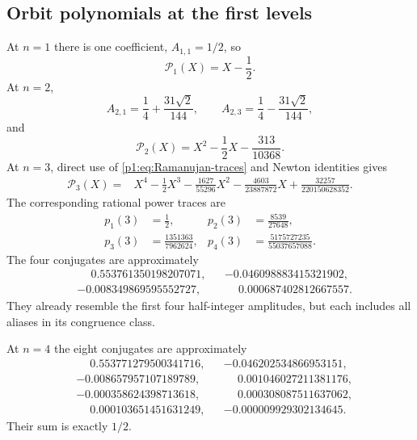 \documentclass[11pt,oneside]{article}
\theoremstyle{definition}
\theoremstyle{remark}
\begin{document}
\subsection{Orbit polynomials at the first levels}

At $n=1$ there is one coefficient, $A_{1,1}=1/2$, so
\begin{equation}\label{p1:eq:P1-poly}
 \mathcal P_1(X)=X-\frac12.
\end{equation}
At $n=2$,
\begin{equation}\label{p1:eq:A2-values}
 A_{2,1}=\frac14+\frac{31\sqrt2}{144},
 \qquad
 A_{2,3}=\frac14-\frac{31\sqrt2}{144},
\end{equation}
and
\begin{equation}\label{p1:eq:P2-poly}
 \boxed{
 \mathcal P_2(X)=X^2-\frac12X-\frac{313}{10368}.}
\end{equation}
At $n=3$, direct use of \eqref{p1:eq:Ramanujan-traces} and Newton identities gives
\begin{equation}\label{p1:eq:P3-poly}
\boxed{
\begin{aligned}
 \mathcal P_3(X)={}&X^4-\frac12X^3
 -\frac{1627}{55296}X^2
 -\frac{4603}{23887872}X
 +\frac{32257}{220150628352}.
\end{aligned}}
\end{equation}
The corresponding rational power traces are
\begin{align}
 p_1(3)&=\frac12,
 &p_2(3)&=\frac{8539}{27648},
 \label{p1:eq:p3-12}\\
 p_3(3)&=\frac{1351363}{7962624},
 &p_4(3)&=\frac{5175727235}{55037657088}.
 \label{p1:eq:p3-34}
\end{align}
The four conjugates are approximately
\begin{equation}\label{p1:eq:n3-conjugates}
\begin{aligned}
 &\phantom{-}0.553761350198207071,
 &&-0.046098883415321902,\\
 &-0.008349869595552727,
 &&\phantom{-}0.000687402812667557.
\end{aligned}
\end{equation}
They already resemble the first four half-integer amplitudes, but each includes
all aliases in its congruence class.

At $n=4$ the eight conjugates are approximately
\begin{align*}
 &\phantom{-}0.553771279500341716,
 &&-0.046202534866953151,\\
 &-0.008657957107189789,
 &&\phantom{-}0.001046027211381176,\\
 &-0.000358624398713618,
 &&\phantom{-}0.000308087511637062,\\
 &\phantom{-}0.000103651451631249,
 &&-0.000009929302134645.
\end{align*}
Their sum is exactly $1/2$.
\end{document}
